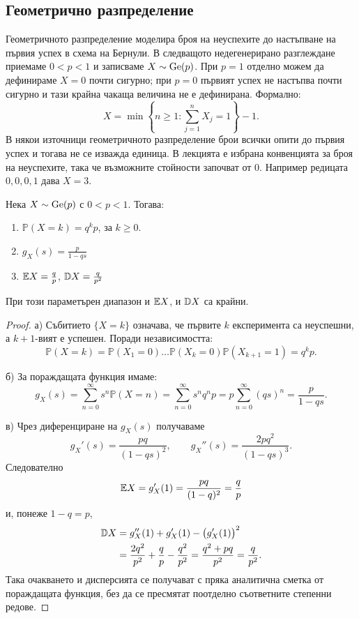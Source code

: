 \subsection{Геометрично разпределение}\label{sec:geometric}

Геометричното разпределение моделира броя на неуспехите до настъпване на първия успех в схема на Бернули.
В следващото недегенерирано разглеждане приемаме $0<p<1$ и записваме
$X \sim \operatorname{Ge}(p)$. При $p=1$ отделно можем да дефинираме $X=0$ почти сигурно;
при $p=0$ първият успех не настъпва почти сигурно и тази крайна чакаща величина не е
дефинирана. Формално:
\[ X = \min\left\{n \ge 1 : \sum_{j=1}^n X_j = 1\right\} - 1. \]
В някои източници геометричното разпределение брои всички опити до първия успех и тогава не се изважда единица. В лекцията е избрана конвенцията за броя на неуспехите, така че възможните стойности започват от $0$. Например редицата $0,0,0,1$ дава $X=3$.

\begin{prop}
Нека $X \sim \operatorname{Ge}(p)$ с $0<p<1$. Тогава:
\begin{enumerate}
    \item[а)] $\mathbb{P}(X=k) = q^k p$, за $k \ge 0$.
    \item[б)] $g_X(s) = \frac{p}{1-qs}$
    \item[в)] $\mathbb{E} X = \frac{q}{p}$, $\mathbb{D} X = \frac{q}{p^2}$
\end{enumerate}
При този параметърен диапазон и $\mathbb{E} X$, и $\mathbb{D} X$ са крайни.
\end{prop}

\begin{proof}
а) Събитието $\{X=k\}$ означава, че първите $k$ експеримента са неуспешни, а $k+1$-вият е успешен. Поради независимостта:
\[ \mathbb{P}(X=k) = \mathbb{P}(X_1=0) \dots \mathbb{P}(X_k=0) \mathbb{P}(X_{k+1}=1) = q^k p. \]

б) За пораждащата функция имаме:
\[ g_X(s) = \sum_{n=0}^{\infty} s^n \mathbb{P}(X=n) = \sum_{n=0}^{\infty} s^n q^n p = p \sum_{n=0}^{\infty} (qs)^n = \frac{p}{1-qs}. \]

в) Чрез диференциране на $g_X(s)$ получаваме
\[
g_X'(s)=\frac{pq}{(1-qs)^2},
\qquad
g_X''(s)=\frac{2pq^2}{(1-qs)^3}.
\]
Следователно
\[
\mathbb{E} X=g_X'(1)=\frac{pq}{(1-q)^2}=\frac{q}{p}
\]
и, понеже $1-q=p$,
\begin{align*}
\mathbb{D} X
  &=g_X''(1)+g_X'(1)-\bigl(g_X'(1)\bigr)^2 \\
  &=\frac{2q^2}{p^2}+\frac{q}{p}-\frac{q^2}{p^2}
    =\frac{q^2+pq}{p^2}
    =\frac{q}{p^2}.
\end{align*}
Така очакването и дисперсията се получават с пряка аналитична сметка от пораждащата функция, без да се пресмятат поотделно съответните степенни редове.
\end{proof}

